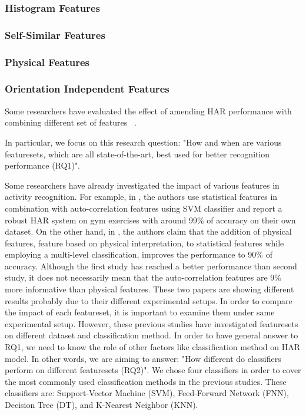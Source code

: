 \documentclass[journal,article,submit,moreauthors,pdftex]{Definitions/mdpi}
\begin{document}
\subsubsection{Histogram Features}
\subsubsection{Self-Similar Features}
\subsubsection{Physical Features}
\subsubsection{Orientation Independent Features}


Some researchers have evaluated the effect of amending HAR performance with combining different set of features  ~\cite{yazdansepas2016multi, chen2018distilling}.



In particular, we focus on this research question: "How and when are various featuresets, which are all state-of-the-art, best used for better recognition performance (RQ1)".

Some researchers have already investigated the impact of various features in activity recognition\cite{morris2014recofit,zhang2013human, rosati2018comparison}. For example, in \cite{morris2014recofit}, the authors use statistical features in combination with auto-correlation features using SVM classifier and report a robust HAR system on gym exercises with around 99\% of accuracy on their own dataset. On the other hand, in \cite{zhang2011feature}, the authors claim that the addition of physical features, feature based on physical interpretation, to statistical features while employing a multi-level classification, improves the performance to 90\% of accuracy. Although the first study has reached a better performance than second study, it does not necessarily mean that the auto-correlation features are 9\% more informative than physical features. These two papers are showing different results probably due to their different experimental setups. In order to compare the impact of each featureset, it is important to examine them under same experimental setup. However, these previous studies have investigated featuresets on different dataset and classification method. In order to have general answer to RQ1, we need to know the role of other factors like classification method on HAR model. In other words, we are aiming to answer: "How different do classifiers perform on different featuresets (RQ2)". We chose four classifiers in order to cover the most commonly used classification methods in the previous studies. These classifiers are: Support-Vector Machine (SVM), Feed-Forward Network (FNN), Decision Tree (DT), and K-Nearest Neighbor (KNN).
\end{document}

